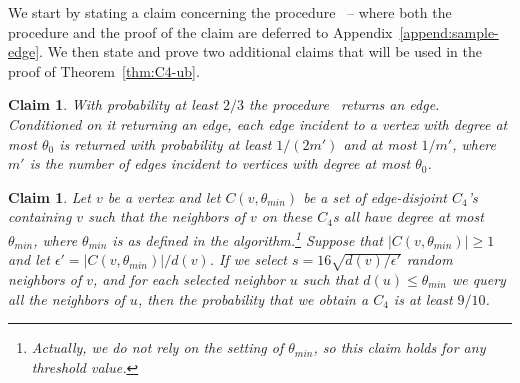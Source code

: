 \documentclass{article}
\newcommand{\eps}{\epsilon}
\newtheorem{claim}[lemma]{Claim}
\newcommand{\commentt}[1]{ {}}
\newcommand{\SelectEdge}{\hyperref[alg:select-edge]{\color{black}{\sf Select-an-Edge}}}
\begin{document}
We start by stating a claim concerning the procedure \SelectEdge\ -- where both the procedure and the proof of the claim are deferred to Appendix~\ref{append:sample-edge}. We then state and prove two additional claims that will be used in the proof of Theorem~\ref{thm:C4-ub}.

\begin{claim}\label{clm:select-edge} 
With probability at least $2/3$ the procedure \SelectEdge\ returns an edge. Conditioned on it returning an edge, each edge incident to a vertex with degree at most $\theta_0$ is returned with probability at least $1/(2m')$ and at most $1/m'$, where $m'$ is the number of edges incident to vertices with degree at most $\theta_0$.
\end{claim}

\begin{claim}\label{clm:C4-ub1}
Let $v$ be a vertex and let $C(v,\theta_{min})$ be a set of edge-disjoint $C_4$'s 
containing $v$ such that the neighbors of $v$ on these $C_4$s all have degree at most $\theta_{min}$, where $\theta_{min}$ is as defined in the algorithm.\footnote{Actually, we do not rely on the setting of $\theta_{min}$, so this claim holds for any threshold value.} Suppose that $|C(v,\theta_{min})|\geq 1$ and let $\eps' = |C(v,\theta_{min})|/d(v)$.
If we select $s = 16\sqrt{d(v)/\eps'}$ random neighbors of $v$, and for each selected neighbor $u$ such that {$d(u)\leq \theta_{min}$} we query all the neighbors of $u$,
then the probability that we obtain a $C_4$ is at least $9/10$.
\end{claim}
\end{document}
